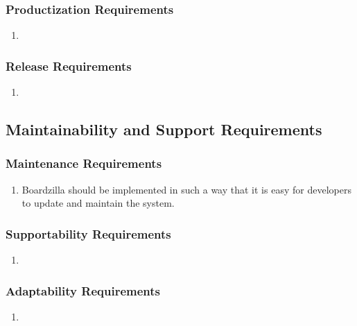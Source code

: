 \documentclass[]{article}
\begin{document}
\subsubsection{Productization Requirements}
\label{ssub:productization_requirements}
\begin{enumerate}[{OE}1. ]
  \item 
\end{enumerate}

\subsubsection{Release Requirements}
\label{ssub:release_requirements}
\begin{enumerate}[{OE}1. ]
  \item 
\end{enumerate}


\subsection{Maintainability and Support Requirements}
\label{sub:maintainability_and_support_requirements}

\subsubsection{Maintenance Requirements}
\label{ssub:maintenance_requirements}
\begin{enumerate}[{MS}1. ]
  \item Boardzilla should be implemented in such a way that it is easy for developers to update and maintain the system. 
\end{enumerate}

\subsubsection{Supportability Requirements}
\label{ssub:supportability_requirements}
\begin{enumerate}[{MS}1. ]
  \item 
\end{enumerate}

\subsubsection{Adaptability Requirements}
\label{ssub:adaptability_requirements}
\begin{enumerate}[{MS}1. ]
  \item 
\end{enumerate}
\end{document}
